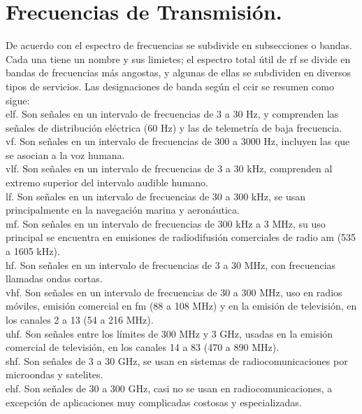 \section*{\fontsize{12}{18}\selectfont Frecuencias de Transmisión.}

\begin{justify}
    De acuerdo con \textcite{tomasi2003sistemas} el espectro de frecuencias se subdivide en subsecciones o bandas. Cada una tiene un nombre y sus limietes;
    el espectro total útil de \gls{rf} se divide en bandas de frecuencias más angostas, y algunas de ellas se
    subdividen en diversos tipos de servicios. Las designaciones de banda según el \gls{ccir} se resumen como sigue:\\

    \gls{elf}. Son señales en un intervalo de frecuencias de 3 a 30 Hz, y comprenden las señales de distribución eléctrica
    (60 Hz) y las de telemetría de baja frecuencia.\\

    \gls{vf}. Son señales en un intervalo de frecuencias de 300 a 3000 Hz, incluyen las que se asocian a la voz humana.\\

    \gls{vlf}. Son señales en un intervalo de frecuencias de 3 a 30 kHz, comprenden al extremo superior del intervalo audible humano.\\

    \gls{lf}. Son señales en un intervalo de frecuencias de 30 a 300 kHz, se usan principalmente en la navegación marina y aeronáutica.\\

    \gls{mf}. Son señales en un intervalo de frecuencias de 300 kHz a 3 MHz, su uso principal se encuentra en emisiones de radiodifusión comerciales
    de radio \gls{am} (535 a 1605 kHz).\\

    \gls{hf}. Son señales en un intervalo de frecuencias de 3 a 30 MHz, con frecuencias llamadas ondas cortas.\\

    \gls{vhf}. Son señales en un intervalo de frecuencias de 30 a 300 MHz, uso en radios móviles, emisión comercial en \gls{fm} (88 a 108 MHz) y en la
    emisión de televisión, en los canales 2 a 13 (54 a 216 MHz).\\

    \gls{uhf}. Son señales entre los límites de 300 MHz y 3 GHz, usadas en la emisión comercial de televisión, en los canales 14 a 83 (470 a 890 MHz).\\

    \gls{shf}. Son señales de 3 a 30 GHz, se usan en sistemas de radiocomunicaciones por microondas y satelites.\\

    \gls{ehf}. Son señales de 30 a 300 GHz, casi no se usan en radiocomunicaciones, a excepción de aplicaciones muy complicadas
    costosas y especializadas.\\
\end{justify}